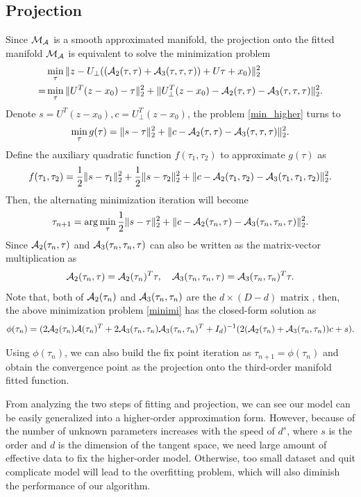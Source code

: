 \documentclass[aos,preprint]{imsart}
\theoremstyle{remark}
\begin{document}
\subsection{Projection}
Since $\cal M_A$ is a smooth approximated manifold, the projection onto the fitted manifold $\cal M_A$ is equivalent to solve the minimization problem
\begin{equation}\label{min_higher}
\begin{aligned}
&\min_\tau \|z -  U_{\perp} (({\cal A}_2 (\tau,\tau)+{\cal A}_3 (\tau,\tau,\tau)) + U \tau +x_0)\|_2^2\\
=&\min_\tau \|U^T (z-x_0)-\tau\|_2^2+\|U^T_{\perp}(z-x_0)- {\cal A}_2 (\tau,\tau)-{\cal A}_3 (\tau,\tau,\tau)\|_2^2.
\end{aligned}
\end{equation}
Denote $s=U^T (z-x_0), c =U^T_{\perp}(z-x_0)$, the problem \eqref{min_higher} turns to
\[
\min_\tau g(\tau)= \|s-\tau\|_2^2+\|c- {\cal A}_2 (\tau,\tau)-{\cal A}_3 (\tau,\tau,\tau)\|_2^2.
\]
 Define the auxiliary quadratic function $f(\tau_1,\tau_2)$ to approximate $g(\tau)$ as
\[
f(\tau_1,\tau_2) = \frac{1}{2}\|s-\tau_1\|_2^2+ \frac{1}{2}\|s-\tau_2\|_2^2+\|c- {\cal A}_2 (\tau_1,\tau_2)-{\cal A}_3 (\tau_1,\tau_1,\tau_2)\|_2^2.
\]
Then, the alternating minimization iteration will become
\begin{equation}\label{minimi}
\tau_{n+1} = \arg\min_\tau \frac{1}{2}\|s-\tau\|_2^2+\|c- {\cal A}_2 (\tau_n,\tau)-{\cal A}_3 (\tau_n,\tau_n,\tau)\|_2^2.
\end{equation}
Since ${\cal A}_2 (\tau_n,\tau)$ and ${\cal A}_3 (\tau_n,\tau_n,\tau)$ can also be written as the matrix-vector multiplication as
\[
{\cal A}_2 (\tau_n,\tau) = {\cal A}_2 (\tau_n) ^T \tau,\quad {\cal A}_3 (\tau_n,\tau_n,\tau) = {\cal A}_3 (\tau_n,\tau_n)^T \tau.
\]
Note that, both of ${\cal A}_2(\tau_n)$ and ${\cal A}_3(\tau_n,\tau_n)$ are the $d\times (D-d)$ matrix , then, the above minimization problem \eqref{minimi} has the closed-form solution as
\[
 \phi(\tau_{n})=( 2{\cal A}_2(\tau_{n}){\cal A}(\tau_{n})^T+2{\cal A}_3(\tau_{n},\tau_n){\cal A}_3(\tau_{n},\tau_n)^T+ I_d)^{-1} (2({\cal A}_2(\tau_{n})+{\cal A}_3(\tau_{n},\tau_n))c+ s).
\]

Using $\phi(\tau_{n})$, we can also build the fix point iteration as $\tau_{n+1} =  \phi(\tau_{n})$ and obtain the convergence point as the projection onto the third-order manifold fitted function.

From analyzing the two steps of fitting and projection, we can see our model can be easily generalized into a higher-order approximation form. However, because of the number of unknown parameters increases with the speed of $d^s$, where $s$ is the order and $d$ is the dimension of the tangent space, we need large amount of effective data to fix the higher-order model. Otherwise, too small dataset and quit complicate model will lead to the overfitting problem, which will also diminish the performance of our algorithm.
\end{document}
